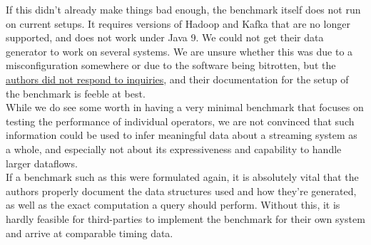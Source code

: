 If this didn't already make things bad enough, the benchmark itself does not run on current setups. It requires versions of Hadoop and Kafka that are no longer supported, and does not work under Java 9. We could not get their data generator to work on several systems. We are unsure whether this was due to a misconfiguration somewhere or due to the software being bitrotten, but the \href{https://github.com/intel-hadoop/HiBench/issues/535}{authors did not respond to inquiries}, and their documentation for the setup of the benchmark is feeble at best. \\

While we do see some worth in having a very minimal benchmark that focuses on testing the performance of individual operators, we are not convinced that such information could be used to infer meaningful data about a streaming system as a whole, and especially not about its expressiveness and capability to handle larger dataflows. \\

If a benchmark such as this were formulated again, it is absolutely vital that the authors properly document the data structures used and how they're generated, as well as the exact computation a query should perform. Without this, it is hardly feasible for third-parties to implement the benchmark for their own system and arrive at comparable timing data.


